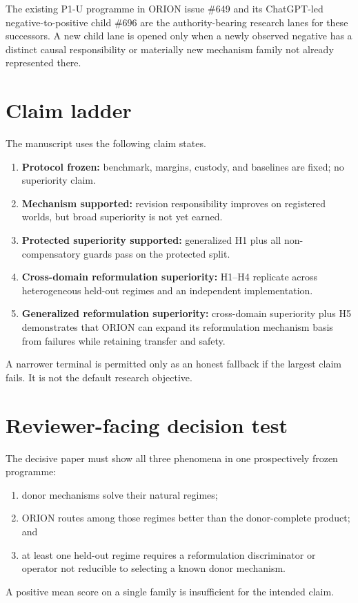 \documentclass[11pt]{article}
\begin{document}
The existing P1-U programme in ORION issue \#649 and its ChatGPT-led negative-to-positive child \#696 are the authority-bearing research lanes for these successors. A new child lane is opened only when a newly observed negative has a distinct causal responsibility or materially new mechanism family not already represented there.

\section{Claim ladder}
The manuscript uses the following claim states.
\begin{enumerate}[leftmargin=*]
    \item \textbf{Protocol frozen:} benchmark, margins, custody, and baselines are fixed; no superiority claim.
    \item \textbf{Mechanism supported:} revision responsibility improves on registered worlds, but broad superiority is not yet earned.
    \item \textbf{Protected superiority supported:} generalized H1 plus all non-compensatory guards pass on the protected split.
    \item \textbf{Cross-domain reformulation superiority:} H1--H4 replicate across heterogeneous held-out regimes and an independent implementation.
    \item \textbf{Generalized reformulation superiority:} cross-domain superiority plus H5 demonstrates that ORION can expand its reformulation mechanism basis from failures while retaining transfer and safety.
\end{enumerate}
A narrower terminal is permitted only as an honest fallback if the largest claim fails. It is not the default research objective.

\section{Reviewer-facing decision test}
The decisive paper must show all three phenomena in one prospectively frozen programme:
\begin{enumerate}[leftmargin=*]
    \item donor mechanisms solve their natural regimes;
    \item ORION routes among those regimes better than the donor-complete product; and
    \item at least one held-out regime requires a reformulation discriminator or operator not reducible to selecting a known donor mechanism.
\end{enumerate}
A positive mean score on a single family is insufficient for the intended claim.
\end{document}
